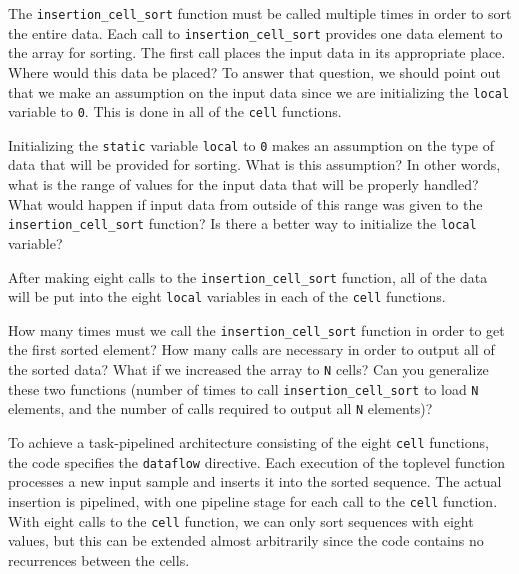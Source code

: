 The \lstinline{insertion_cell_sort} function must be called multiple times in order to sort the entire data. Each call to \lstinline{insertion_cell_sort} provides one data element to the array for sorting. The first call places the input data in its appropriate place. Where would this data be placed? To answer that question, we should point out that we make an assumption on the input data since we are initializing the \lstinline{local} variable to \lstinline{0}. This is done in all of the \lstinline{cell} functions.

\begin{exercise}
Initializing the \lstinline{static} variable \lstinline{local} to \lstinline{0} makes an assumption on the type of data that will be provided for sorting. What is this assumption? In other words, what is the range of values for the input data that will be properly handled? What would happen if input data from outside of this range was given to the \lstinline{insertion_cell_sort} function? Is there a better way to initialize the \lstinline{local} variable?
\end{exercise}

After making eight calls to the \lstinline{insertion_cell_sort} function, all of the data will be put into the eight \lstinline{local} variables in each of the \lstinline{cell} functions. 

\begin{exercise}
How many times must we call the \lstinline{insertion_cell_sort} function in order to get the first sorted element? How many calls are necessary in order to output all of the sorted data? What if we increased the array to \lstinline{N} cells? Can you generalize these two functions (number of times to call \lstinline{insertion_cell_sort} to load \lstinline{N} elements, and the number of calls required to output all \lstinline{N} elements)?
\end{exercise}

To achieve a task-pipelined architecture consisting of the eight \lstinline{cell} functions, the code specifies the \lstinline{dataflow} directive. Each execution of the toplevel function processes a new input sample and inserts it into the sorted sequence.  The actual insertion is pipelined, with one pipeline stage for each call to the \lstinline{cell} function. With eight calls to the \lstinline{cell} function, we can only sort sequences with eight values, but this can be extended almost arbitrarily since the code contains no recurrences between the cells.

